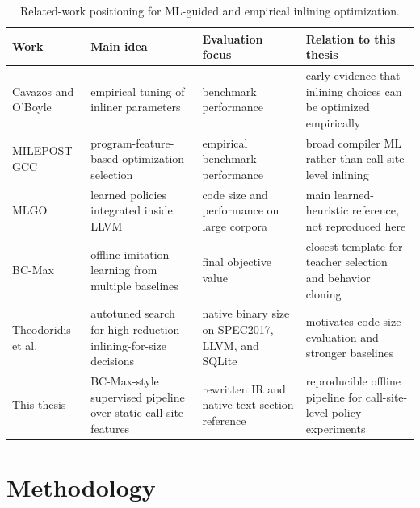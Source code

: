\documentclass[12pt, a4paper]{report}
\begin{document}
\begin{table}[H]
\centering
\small
\setlength{\tabcolsep}{4.5pt}
\renewcommand{\arraystretch}{1.14}
\begin{tabular}{|>{\raggedright\arraybackslash}p{2.75cm}|
                >{\raggedright\arraybackslash}p{3.35cm}|
                >{\raggedright\arraybackslash}p{3.15cm}|
                >{\raggedright\arraybackslash}p{4.25cm}|}
\hline
Work & Main idea & Evaluation focus & Relation to this thesis \\
\hline
Cavazos and O'Boyle \cite{cavazos2005automatic}
& empirical tuning of inliner parameters
& benchmark performance
& early evidence that inlining choices can be optimized empirically \\
\hline
MILEPOST GCC \cite{milepostgcc}
& program-feature-based optimization selection
& empirical benchmark performance
& broad compiler ML rather than call-site-level inlining \\
\hline
MLGO \cite{mlgo,llvmmlgo}
& learned policies integrated inside LLVM
& code size and performance on large corpora
& main learned-heuristic reference, not reproduced here \\
\hline
BC-Max \cite{bcmax}
& offline imitation learning from multiple baselines
& final objective value
& closest template for teacher selection and behavior cloning \\
\hline
Theodoridis et al. \cite{theodoridis2022optimal}
& autotuned search for high-reduction inlining-for-size decisions
& native binary size on SPEC2017, LLVM, and SQLite
& motivates code-size evaluation and stronger baselines \\
\hline
This thesis
& BC-Max-style supervised pipeline over static call-site features
& rewritten IR and native text-section reference
& reproducible offline pipeline for call-site-level policy experiments \\
\hline
\end{tabular}
\renewcommand{\arraystretch}{1}
\caption{Related-work positioning for ML-guided and empirical inlining optimization.}
\label{tab:related-work-summary}
\end{table}


\chapter{Methodology}
\end{document}
